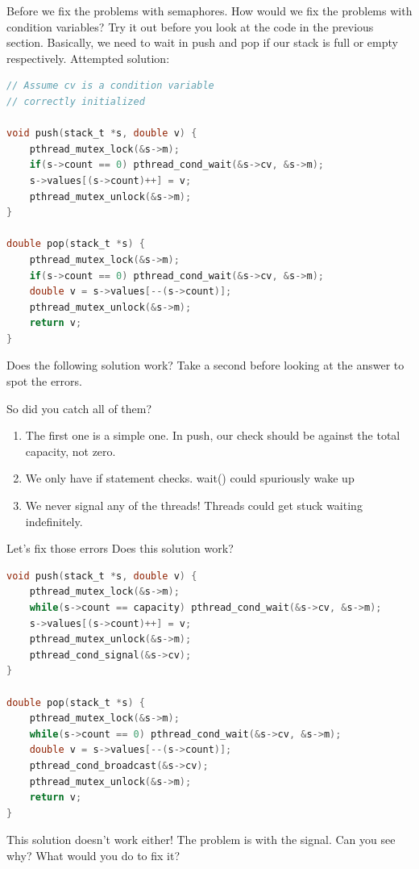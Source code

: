 Before we fix the problems with semaphores.
How would we fix the problems with condition variables?
Try it out before you look at the code in the previous section.
Basically, we need to wait in push and pop if our stack is full or empty respectively.
Attempted solution:

\begin{lstlisting}[language=C]
// Assume cv is a condition variable
// correctly initialized

void push(stack_t *s, double v) {
    pthread_mutex_lock(&s->m);
    if(s->count == 0) pthread_cond_wait(&s->cv, &s->m);
    s->values[(s->count)++] = v;
    pthread_mutex_unlock(&s->m);
}

double pop(stack_t *s) {
    pthread_mutex_lock(&s->m);
    if(s->count == 0) pthread_cond_wait(&s->cv, &s->m);
    double v = s->values[--(s->count)];
    pthread_mutex_unlock(&s->m);
    return v;
}
\end{lstlisting}

Does the following solution work?
Take a second before looking at the answer to spot the errors.

So did you catch all of them?
\begin{enumerate}
\item The first one is a simple one. In push, our check should be against the total capacity, not zero.
\item We only have if statement checks. wait() could spuriously wake up
\item We never signal any of the threads! Threads could get stuck waiting indefinitely.
\end{enumerate}

Let's fix those errors
Does this solution work?

\begin{lstlisting}[language=C]
void push(stack_t *s, double v) {
    pthread_mutex_lock(&s->m);
    while(s->count == capacity) pthread_cond_wait(&s->cv, &s->m);
    s->values[(s->count)++] = v;
    pthread_mutex_unlock(&s->m);
    pthread_cond_signal(&s->cv);
}

double pop(stack_t *s) {
    pthread_mutex_lock(&s->m);
    while(s->count == 0) pthread_cond_wait(&s->cv, &s->m);
    double v = s->values[--(s->count)];
    pthread_cond_broadcast(&s->cv);
    pthread_mutex_unlock(&s->m);
    return v;
}
\end{lstlisting}

This solution doesn't work either!
The problem is with the signal.
Can you see why? What would you do to fix it?


